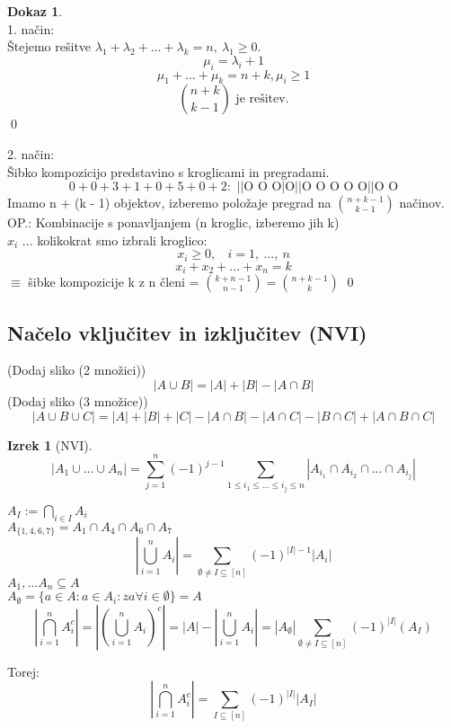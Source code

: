 \documentclass[a4paper,12pt]{article}
\theoremstyle{definition}
\newtheorem{theorem}[counter]{Izrek}
\newtheorem{pro}[counter]{Dokaz}
\theoremstyle{remark}
\begin{document}
\begin{pro}\mbox{}\\
1. način:\\
Štejemo rešitve $\lambda_1 + \lambda_2 + ... + \lambda_k = n, \ \lambda_1 \geqslant 0$.\\
\[\mu_i = \lambda_i + 1\]
\[\mu_1 + ... + \mu_k = n + k, \mu_i \geqslant 1\]
\[\binom{n+k}{k-1} \text{ je rešitev.}\]
\qed

2. način:\\
Šibko kompozicijo predstavino s kroglicami in pregradami.
\[0 + 0 + 3 + 1 + 0 + 5 + 0 + 2:\text{   ||O O O|O||O O O O O||O O}\]
Imamo n + (k - 1) objektov, izberemo položaje pregrad na $\binom{n + k - 1}{k - 1}$ načinov.\\
OP.: Kombinacije s ponavljanjem (n kroglic, izberemo jih k)\\
$x_i$ ... kolikokrat smo izbrali kroglico:
\[x_i \geqslant 0, \ \ \ \ i = 1, \ ..., \ n\]
\[x_i + x_2 + ... + x_n = k\]
$\equiv$ šibke kompozicije k z n členi = $\binom{k + n - 1}{n - 1} = \binom{n + k - 1}{k}$
\qed
\end{pro}

\subsection{Načelo vključitev in izključitev (NVI)}
(Dodaj sliko (2 množici))
\[|A \cup B| = |A| + |B| - |A \cap B|\]
(Dodaj sliko (3 množice))
\[|A \cup B \cup C| = |A| + |B| + |C| - |A \cap B| - |A \cap C| - |B \cap C| + |A \cap B \cap C|\]

\begin{theorem}[NVI]
\[|A_1 \cup ... \cup A_n| = \sum_{j = 1}^{n} (-1)^{j - 1} \sum_{1 \leqslant i_1 \leqslant ... \leqslant i_j \leqslant n}|A_{i_1} \cap A_{i_2} \cap ... \cap A_{i_j}|\]
\end{theorem}

$A_I := \displaystyle \bigcap_{i \in I} A_i$\\
$A_{\{1,4,6,7\}} = A_1 \cap A_4 \cap A_6 \cap A_7$
\[|\bigcup_{i = 1}^{n} A_i| = \sum_{\emptyset \neq I \subseteq [n]} (-1)^{|I| - 1} |A_i|\]
$A_1, ... A_n \subseteq A$\\
$A_{\emptyset} = \{a \in A : a \in A_i : za \forall i \in \emptyset \} = A$
\[|\bigcap_{i = 1}^n A_i^c| = |(\bigcup_{i = 1}^n A_i)^c| = |A| - |\bigcup_{i = 1}^n A_i| = |A_{\emptyset}|
\sum_{\emptyset \neq I \subseteq [n]} (-1)^{|I|} (A_I)\]

Torej:
\[|\bigcap_{i = 1}^n A_i^c|  = \sum_{I \subseteq [n]} (-1)^{|I|} |A_I|\]
\end{document}
